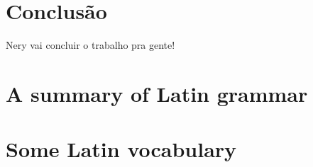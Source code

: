 \documentclass{ifacconf}
\begin{document}
\section{Conclusão}

Nery vai concluir o trabalho pra gente!

                                                   







\appendix
\section{A summary of Latin grammar}    %
\section{Some Latin vocabulary}              %
\end{document}
